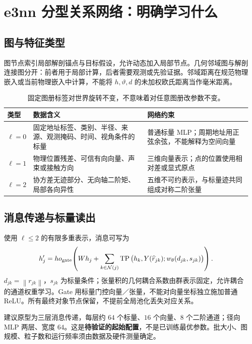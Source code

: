 \documentclass[UTF8,fontset=fandol,11pt,a4paper]{ctexart}
\theoremstyle{plain}
\theoremstyle{definition}
\theoremstyle{remark}
\numberwithin{equation}{section}
\newcommand{\norm}[1]{\left\lVert#1\right\rVert}
\begin{document}
\section{e3nn 分型关系网络：明确学习什么}
\label{sec:network}
\subsection{图与特征类型}
图节点索引局部解剖锚点与目标假设，允许动态加入局部节点。几何邻域图与解剖连接图分开：前者用于局部计算，后者需要观测或先验证据。邻域距离在规范物理嵌入或当前物理嵌入中计算，不能将 $h,\vartheta,d$ 的未加权欧氏距离当作毫米距离。

\begin{table}[htbp]\centering\small
\begin{tabularx}{\linewidth}{P{18mm}YY}\toprule
类型 & 数据含义 & 网络约束\\\midrule
$\ell=0$ & 固定地址标签、类别、半径、来源、观测掩码、时间、视角条件的标量 & 普通标量 MLP；周期地址用正弦余弦，不能解释为空间向量\\
$\ell=1$ & 物理位置残差、可信有向向量、声束或接触方向 & 三维向量表示；点的位置使用相对差或显式原点\\
$\ell=2$ & 协方差无迹部分、无向轴二阶矩、局部各向异性 & 五维不可约表示，与标量迹共同组成对称二阶张量\\\bottomrule
\end{tabularx}
\caption{固定图册标签对世界旋转不变，不意味着对任意图册改参数不变。}
\end{table}

\subsection{消息传递与标量读出}
使用 $\ell\le2$ 的有限多重表示，消息可写为
\begin{equation}
 h_j'=
ho_{\rm gate}\!\left(
 W h_j+\sum_{k\in\mathcal N(j)}
 \operatorname{TP}\big(h_k,Y(\widehat r_{jk});w_\theta(d_{jk},s_{jk})\big)
 \right).
 \label{eq:e3nn}
\end{equation}
$d_{jk}=\norm{r_{jk}}$，$s_{jk}$ 为标量条件；张量积的几何耦合系数由群表示固定，允许耦合的通道权重学习。Gate 用标量门控向量／张量，不能对向量坐标独立施加普通 ReLU\cite{e3nn,e3nndocs}。所有最终对象节点保留，不提前全局池化丢失对应关系。

建议原型为三层消息传递，每层约 $64$ 个标量、$16$ 个向量、$8$ 个二阶通道；径向 MLP 两层、宽度 $64$。这是\textbf{待验证的起始配置}，不是已训练最优参数。批大小、图规模、粒子数和运行频率须由数据及硬件测量确定。
\end{document}
